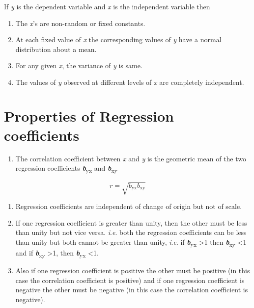\documentclass[
]{book}
\providecommand{\tightlist}{%
  \setlength{\itemsep}{0pt}\setlength{\parskip}{0pt}}
\begin{document}
If \emph{y} is the dependent variable and \emph{x} is the independent variable
then

\begin{enumerate}
\def\labelenumi{\arabic{enumi}.}
\item
  The \emph{x}'s are non-random or fixed constants.
\item
  At each fixed value of \emph{x} the corresponding values of \emph{y} have a
  normal distribution about a mean.
\item
  For any given \emph{x}, the variance of \emph{y} is same.
\item
  The values of \emph{y} observed at different levels of \emph{x} are completely
  independent.
\end{enumerate}

\hypertarget{properties-of-regression-coefficients}{%
\section{Properties of Regression coefficients}\label{properties-of-regression-coefficients}}

\begin{enumerate}
\def\labelenumi{\arabic{enumi}.}
\tightlist
\item
  The correlation coefficient between \emph{x} and \emph{y} is the geometric
  mean of the two regression coefficients \textbf{\emph{b}}\textsubscript{yx} and \textbf{\emph{b}}\textsubscript{xy}
\end{enumerate}

\[r = \sqrt{b_{\text{yx}}b_{\text{xy}}}\]

\begin{enumerate}
\def\labelenumi{\arabic{enumi}.}
\setcounter{enumi}{1}
\item
  Regression coefficients are independent of change of origin but not
  of scale.
\item
  If one regression coefficient is greater than unity, then the other
  must be less than unity but not vice versa. \emph{i}.\emph{e}. both the
  regression coefficients can be less than unity but both cannot be
  greater than unity, \emph{i}.\emph{e}. if \textbf{\emph{b}}\textsubscript{yx} \textgreater1 then \textbf{\emph{b}}\textsubscript{xy} \textless1
  and if \textbf{\emph{b}}\textsubscript{xy} \textgreater1, then \textbf{\emph{b}}\textsubscript{yx} \textless1.
\item
  Also if one regression coefficient is positive the other must be
  positive (in this case the correlation coefficient is positive) and
  if one regression coefficient is negative the other must be negative
  (in this case the correlation coefficient is negative).
\end{enumerate}
\end{document}

